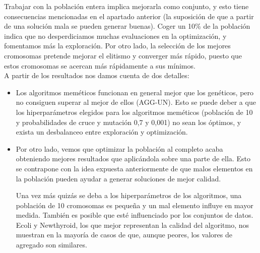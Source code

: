 Trabajar con la población entera implica mejorarla como conjunto, y esto tiene consecuencias mencionadas en el apartado anterior (la suposición de que a partir de una solución mala se pueden generar buenas).
Coger un 10\% de la población indica que no desperdiciamos muchas evaluaciones en la optimización, y fomentamos más la exploración. Por otro lado, la selección de los mejores cromosomas pretende mejorar el elitismo y converger más rápido, puesto que estos cromosomas se acercan más rápidamente a sus mínimos. \\

A partir de los resultados nos damos cuenta de dos detalles:
\begin{itemize}
    \item Los algoritmos meméticos funcionan en general mejor que los genéticos, pero no consiguen superar al mejor de ellos (AGG-UN). Esto se puede deber a que los hiperparámetros elegidos para los algoritmos meméticos (población de 10 y probabilidades de cruce y mutación 0,7 y 0,001) no sean los óptimos, y exista un desbalanceo entre exploración y optimización.
    \item Por otro lado, vemos que optimizar la población al completo acaba obteniendo mejores resultados que aplicándola sobre una parte de ella. Esto se contrapone con la idea expuesta anteriormente de que malos elementos en la población pueden ayudar a generar soluciones de mejor calidad. 
    
    Una vez más quizás se deba a los hiperparámetros de los algoritmos, una población de 10 cromosomas es pequeña y un mal elemento influye en mayor medida. También es posible que esté influenciado por los conjuntos de datos. Ecoli y Newthyroid, los que mejor representan la calidad del algoritmo, nos muestran en la mayoría de casos de que, aunque peores, los valores de agregado son similares. 
\end{itemize}